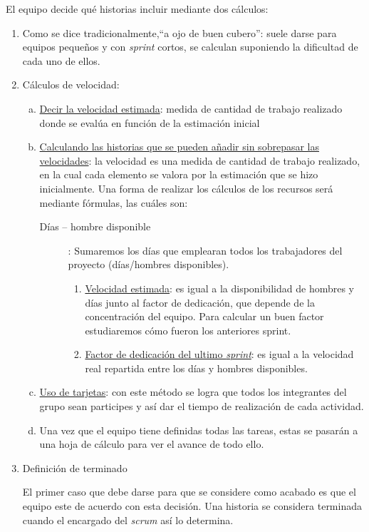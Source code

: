 El equipo decide qué historias incluir mediante dos cálculos:
\begin{enumerate}
	\item Como se dice tradicionalmente,``a ojo de buen cubero'': suele darse para equipos pequeños y con \textit{sprint} cortos, se calculan suponiendo la dificultad de cada uno de ellos.
	\item Cálculos de velocidad:
	 \begin{enumerate}[a)]
	 	\item \underline{Decir la velocidad estimada}: medida de cantidad de trabajo realizado donde se evalúa en función de la estimación inicial
	 	\item \underline{Calculando las historias que se pueden añadir sin sobrepasar las velocidades}: la velocidad es una medida de cantidad de trabajo realizado, en la cual cada elemento se valora por la estimación que se hizo inicialmente.
	 	Una forma de realizar los cálculos de los recursos será mediante fórmulas, las cuáles son:
	 	\begin{description}
	 		\item [Días – hombre disponible]: Sumaremos los días que emplearan todos los trabajadores del proyecto (días/hombres disponibles).
	 		\begin{enumerate}
	 			\item \underline{Velocidad estimada}:  es igual a la disponibilidad de hombres y días junto al factor de dedicación, que depende de la concentración del equipo. Para calcular un buen factor estudiaremos cómo fueron los anteriores sprint.
	 			\item \underline{Factor de dedicación del ultimo \textit{sprint}}: es igual a la velocidad real repartida entre los días y hombres disponibles.
	 		\end{enumerate}
 		\end{description}
 	\item \underline{Uso de tarjetas}: con este método se logra que todos los integrantes del grupo sean participes y así dar el tiempo de realización de cada actividad.
 	\item Una vez que el equipo tiene definidas todas las tareas, estas se pasarán a una hoja de cálculo  para ver el avance de todo ello.
    \end{enumerate}
	\item Definición de terminado
	
	El primer caso que debe darse para que se considere como acabado es 	que el equipo este de acuerdo con esta decisión. Una historia se considera terminada cuando el encargado del \textit{scrum} así lo determina.
	 

\end{enumerate}
